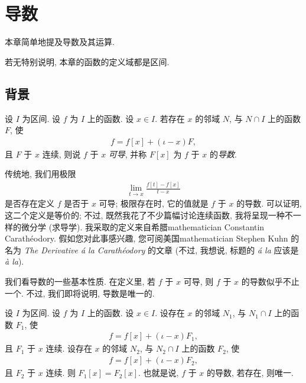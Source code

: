 \chapter{导数}

本章简单地提及导数及其运算.

若无特别说明, 本章的函数的定义域都是区间.

\section{背景}

\begin{definition}
    设 $I$ 为区间.
    设 $f$ 为 $I$ 上的函数.
    设 $x \in I$.
    若存在 $x$ 的邻域 $N$, 与 $N \cap I$ 上的函数 $F$, 使
    \begin{align*}
        f = f[x] + (\iota - x)F,
    \end{align*}
    且 $F$ 于 $x$ 连续,
    则说 $f$ 于 $x$ \emph{可导},
    并称 $F[x]$ 为 $f$ 于 $x$ 的\emph{导数}.
\end{definition}

\begin{remark}
    传统地, 我们用极限
    \begin{align*}
        \lim_{t \to x} {\frac{f[t] - f[x]}{t - x}}
    \end{align*}
    是否存在定义 $f$ 是否于 $x$ 可导;
    极限存在时, 它的值就是 $f$ 于 $x$ 的导数.
    可以证明, 这二个定义是等价的;
    不过, 既然我花了不少篇幅讨论连续函数,
    我将呈现一种不一样的微分学 (求导学).
    我采取的定义来自希腊\gls{mathematician}
    Constantin Carath\'eodory.
    假如您对此事感兴趣,
    您可阅美国\gls{mathematician} Stephen Kuhn 的名为
    \textit{The Derivative \'a la Carath\'eodory} 的文章
    (不过, 我想说,
    标题的 \textit{\'a la} 应该是 \textit{\`a la}).
\end{remark}

我们看导数的一些基本性质.
在定义里, 若 $f$ 于 $x$ 可导, 则 $f$ 于 $x$ 的导数似乎不止一个.
不过, 我们即将说明, 导数是唯一的.

\begin{theorem}
    设 $I$ 为区间.
    设 $f$ 为 $I$ 上的函数.
    设 $x \in I$.
    设存在 $x$ 的邻域 $N_1$, 与 $N_1 \cap I$ 上的函数 $F_1$, 使
    \begin{align*}
        f = f[x] + (\iota - x) F_1,
    \end{align*}
    且 $F_1$ 于 $x$ 连续.
    设存在 $x$ 的邻域 $N_2$, 与 $N_2 \cap I$ 上的函数 $F_2$, 使
    \begin{align*}
        f = f[x] + (\iota - x) F_2,
    \end{align*}
    且 $F_2$ 于 $x$ 连续.
    则 $F_1 [x] = F_2 [x]$.
    也就是说, $f$ 于 $x$ 的导数, 若存在, 则唯一.
\end{theorem}

